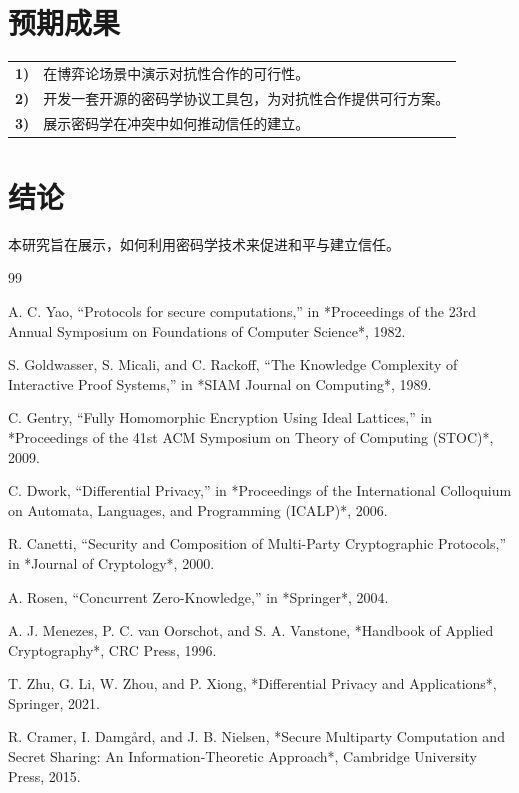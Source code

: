 \documentclass[conference]{IEEEtran}
\begin{document}
\section{预期成果}

\begin{tabular}{lp{210pt}}
    {\small \textbf{1)}} & {\small 在博弈论场景中演示对抗性合作的可行性。} \\
    {\small \textbf{2)}} & {\small 开发一套开源的密码学协议工具包，为对抗性合作提供可行方案。} \\
    {\small \textbf{3)}} & {\small 展示密码学在冲突中如何推动信任的建立。}
\end{tabular}

\section{结论}
本研究旨在展示，如何利用密码学技术来促进和平与建立信任。

\begin{thebibliography}{99}

A. C. Yao, ``Protocols for secure computations,'' in *Proceedings of the 23rd Annual Symposium on Foundations of Computer Science*, 1982.

S. Goldwasser, S. Micali, and C. Rackoff, ``The Knowledge Complexity of Interactive Proof Systems,'' in *SIAM Journal on Computing*, 1989.

C. Gentry, ``Fully Homomorphic Encryption Using Ideal Lattices,'' in *Proceedings of the 41st ACM Symposium on Theory of Computing (STOC)*, 2009.

C. Dwork, ``Differential Privacy,'' in *Proceedings of the International Colloquium on Automata, Languages, and Programming (ICALP)*, 2006.

R. Canetti, ``Security and Composition of Multi-Party Cryptographic Protocols,'' in *Journal of Cryptology*, 2000.

A. Rosen, ``Concurrent Zero-Knowledge,'' in *Springer*, 2004.

A. J. Menezes, P. C. van Oorschot, and S. A. Vanstone, *Handbook of Applied Cryptography*, CRC Press, 1996.

T. Zhu, G. Li, W. Zhou, and P. Xiong, *Differential Privacy and Applications*, Springer, 2021.

R. Cramer, I. Damgård, and J. B. Nielsen, *Secure Multiparty Computation and Secret Sharing: An Information-Theoretic Approach*, Cambridge University Press, 2015.

\end{thebibliography}



\end{document}
